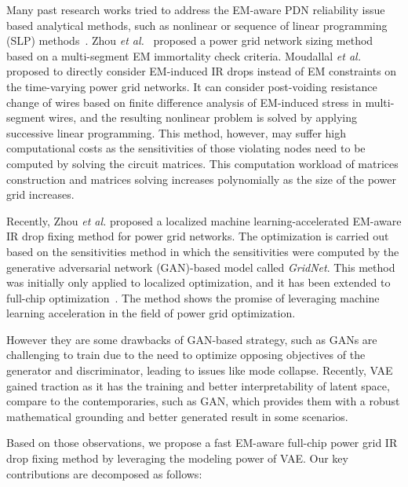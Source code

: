 Many past research works tried to address the EM-aware PDN reliability issue based analytical methods, such as nonlinear or sequence of linear programming (SLP) methods~\cite{ChBr:TCAD'88,DuMa:DAC'89,Tan:DAC'99,Wang:TCAD'05,ZhouSun:TVLSI'19, Sukharev:2019pg, ZhouYu:ASPDAC'20,ZhouJin:ICCAD'20}. Zhou {\it et al.}~\cite{ZhouSun:TVLSI'19,ZhouChen:Integration'21} proposed a power grid network sizing method based on a multi-segment EM immortality check criteria. Moudallal {\it et al.}~\cite{Sukharev:2019pg} proposed to directly consider EM-induced IR drops instead of EM constraints on the time-varying power grid networks. It can consider post-voiding resistance change of wires based on finite difference analysis of EM-induced stress in multi-segment wires, and the resulting nonlinear problem is solved by applying successive linear programming. This method, however, may suffer high computational costs as the sensitivities of those violating nodes need to be computed by solving the circuit matrices. This computation workload of matrices construction and matrices solving increases polynomially as the size of the power grid increases. 
   
Recently, Zhou {\it et al.} proposed a localized machine learning-accelerated EM-aware IR drop fixing method for power grid networks. The optimization is carried out based on the sensitivities method in which the sensitivities were computed by the generative adversarial network (GAN)-based model called {\it GridNet}. This method was initially only applied to localized optimization, and it has been extended to full-chip optimization~\cite{HanLiu:TCAD'22-23}.  The method shows the promise of leveraging machine learning acceleration in the field of power grid optimization.

However they are some drawbacks of GAN-based strategy, such as GANs are challenging to train due to the need to optimize opposing objectives of the generator and discriminator, leading to issues like mode collapse. Recently,  VAE gained traction as it has the training and better interpretability of latent space, compare to the contemporaries, such as GAN, which provides them with a robust mathematical grounding and better generated result in some scenarios. 

Based on those observations, we propose a fast EM-aware full-chip power grid IR drop fixing method by leveraging the modeling power of VAE. Our key contributions are decomposed as follows:

